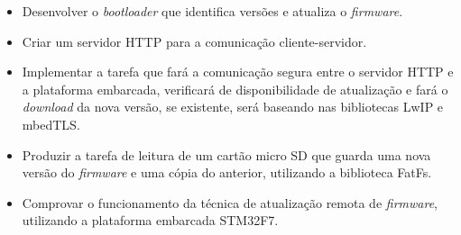  \begin{itemize}
   \item Desenvolver o \textit{bootloader} que identifica versões e atualiza o \textit{firmware}.
   
   \item Criar um servidor HTTP para a comunicação cliente-servidor.
   
   \item Implementar a tarefa que fará a comunicação segura entre o servidor HTTP e a plataforma embarcada, verificará de disponibilidade de atualização e fará o \textit{download} da nova versão, se existente, será baseando nas bibliotecas LwIP e mbedTLS. 
   
   \item Produzir a tarefa de leitura de um cartão micro SD que guarda uma nova versão do \textit{firmware} e uma cópia do anterior, utilizando a biblioteca FatFs.
   \item Comprovar o funcionamento da técnica de atualização remota de \textit{firmware}, utilizando a plataforma embarcada STM32F7.
   
 \end{itemize}
 
